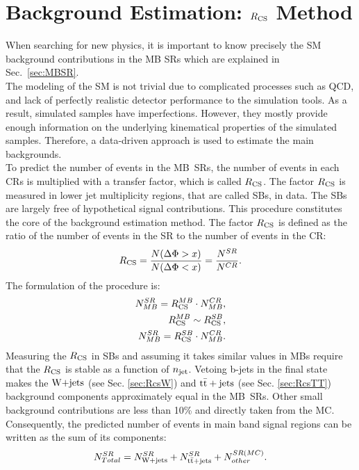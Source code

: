 \chapter{Background Estimation: $R_{\rm CS}$ Method}
\label{chap:Rcs}
\minitoc
When searching for new physics, it is important to know precisely the SM background contributions in the MB SRs which are explained in Sec.~\ref{sec:MBSR}.\\
The modeling of the SM is not trivial due to complicated processes such as QCD, and lack of perfectly realistic detector performance to the simulation tools.
As a result, simulated samples have imperfections. However, they mostly provide enough information on the underlying kinematical properties of the simulated samples. Therefore, a data-driven approach is used to estimate the main backgrounds.\\
To predict the number of events in the MB~SRs, the number of events in each CRs is multiplied with a transfer factor, which is called $R_{\rm CS}$. The factor $R_{\rm CS}$ is measured in lower jet multiplicity regions, that are called SBs, in data. The SBs are largely free of hypothetical signal contributions. This procedure constitutes the core of the background estimation method. 
The factor $R_{\rm CS}$ is defined as the ratio of the number of events in the SR to the number of events in the CR:\\
\begin{equation}
\label{eq:rcs}
R_{\rm CS} = \frac{N(\Delta\Phi>x)}{N(\Delta\Phi<x)} = \frac{N^{SR}}{N^{CR}}.
\end{equation}
The formulation of the procedure is:
\begin{eqnarray}
\label{eq:RcsProc}
N_{MB}^{SR} = R_{\rm CS}^{MB} \cdot N_{MB}^{CR},\nonumber\\
R_{\rm CS}^{MB} \sim R_{\rm CS}^{SB},\nonumber\\
N_{MB}^{SR} = R_{\rm CS}^{SB} \cdot N_{MB}^{CR}.
\end{eqnarray}
Measuring the $R_{\rm CS}$ in SBs and assuming it takes similar values in MBs require that the $R_{\rm CS}$ is stable as a function of $n_{\rm jet}$. 
Vetoing b-jets in the final state makes the $\textrm{W+jets}$ (see Sec. \ref{sec:RcsW}) and ${\rm t\bar{t}+jets}$ (see Sec. \ref{sec:RcsTT}) background components approximately equal in the MB~SRs.  Other small background contributions are less than 10\% and directly taken from the MC.
Consequently, the predicted number of events in main band signal regions can be written as the sum of its components:
\begin{equation}
\label{eq:rcss}
N_{Total}^{SR} = N_{\textrm{W+jets}}^{SR}+N_{{\rm t\bar{t}+jets}}^{SR}+N_{other}^{SR(MC)}.
\end{equation}
